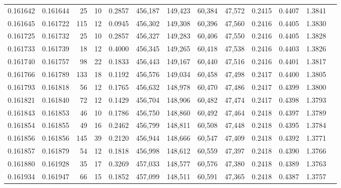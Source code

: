 \begin{tabular}{rrrrrrrrrrrrr}
0.161642 & 0.161644 &    25 &  10 &                                     0.2857 & 456,187 & 149,423 &  60,384 &  47,572 & 0.2415 & 0.4407 & 1.3841 \\
0.161645 & 0.161722 &   115 &  12 &                                     0.0945 & 456,302 & 149,308 &  60,396 &  47,560 & 0.2416 & 0.4405 & 1.3830 \\
0.161725 & 0.161732 &    25 &  10 &                                     0.2857 & 456,327 & 149,283 &  60,406 &  47,550 & 0.2416 & 0.4405 & 1.3828 \\
0.161733 & 0.161739 &    18 &  12 &                                     0.4000 & 456,345 & 149,265 &  60,418 &  47,538 & 0.2416 & 0.4403 & 1.3826 \\
0.161740 & 0.161757 &    98 &  22 &                                     0.1833 & 456,443 & 149,167 &  60,440 &  47,516 & 0.2416 & 0.4401 & 1.3817 \\
0.161766 & 0.161789 &   133 &  18 &                                     0.1192 & 456,576 & 149,034 &  60,458 &  47,498 & 0.2417 & 0.4400 & 1.3805 \\
0.161793 & 0.161818 &    56 &  12 &                                     0.1765 & 456,632 & 148,978 &  60,470 &  47,486 & 0.2417 & 0.4399 & 1.3800 \\
0.161821 & 0.161840 &    72 &  12 &                                     0.1429 & 456,704 & 148,906 &  60,482 &  47,474 & 0.2417 & 0.4398 & 1.3793 \\
0.161843 & 0.161853 &    46 &  10 &                                     0.1786 & 456,750 & 148,860 &  60,492 &  47,464 & 0.2418 & 0.4397 & 1.3789 \\
0.161854 & 0.161855 &    49 &  16 &                                     0.2462 & 456,799 & 148,811 &  60,508 &  47,448 & 0.2418 & 0.4395 & 1.3784 \\
0.161856 & 0.161856 &   145 &  39 &                                     0.2120 & 456,944 & 148,666 &  60,547 &  47,409 & 0.2418 & 0.4392 & 1.3771 \\
0.161857 & 0.161879 &    54 &  12 &                                     0.1818 & 456,998 & 148,612 &  60,559 &  47,397 & 0.2418 & 0.4390 & 1.3766 \\
0.161880 & 0.161928 &    35 &  17 &                                     0.3269 & 457,033 & 148,577 &  60,576 &  47,380 & 0.2418 & 0.4389 & 1.3763 \\
0.161934 & 0.161947 &    66 &  15 &                                     0.1852 & 457,099 & 148,511 &  60,591 &  47,365 & 0.2418 & 0.4387 & 1.3757 \\

\end{tabular}
